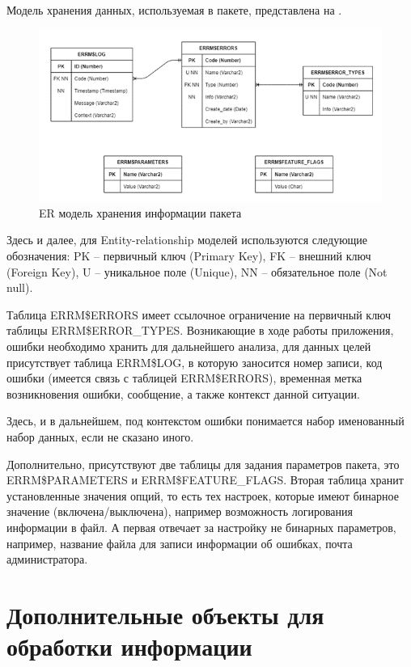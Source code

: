Модель хранения данных, используемая в пакете, представлена на .

\begin{figure}[ht!] 
	\center
	\includegraphics [scale=1] {my_folder/img/C3_er_model.png}
	\caption{ER модель хранения информации пакета} 
	\label{fig:C3_er_model}  
\end{figure}
\FloatBarrier

Здесь и далее, для Entity-relationship моделей используются следующие обозначения: PK – первичный ключ (Primary Key), FK – внешний ключ (Foreign Key), U – уникальное поле (Unique), NN – обязательное поле (Not null). 

Таблица ERRM\$ERRORS имеет ссылочное ограничение на первичный ключ таблицы ERRM\$ERROR\_TYPES. 
Возникающие в ходе работы приложения, ошибки необходимо хранить для дальнейшего анализа, для данных целей присутствует таблица ERRM\$LOG, в которую заносится номер записи, код ошибки (имеется связь с таблицей ERRM\$ERRORS), временная метка возникновения ошибки, сообщение, а также контекст данной ситуации. 

Здесь, и в дальнейшем, под контекстом ошибки понимается набор именованный набор данных, если не сказано иного.  

Дополнительно, присутствуют две таблицы для задания параметров пакета, это ERRM\$PARAMETERS и ERRM\$FEATURE\_FLAGS. Вторая таблица хранит установленные значения опций, то есть тех настроек, которые имеют бинарное значение (включена/выключена), например возможность логирования информации в файл. А первая отвечает за настройку не бинарных параметров, например, название файла для записи информации об ошибках, почта администратора. 


\section{Дополнительные объекты для обработки информации} \label{ch3:sec4}
 
